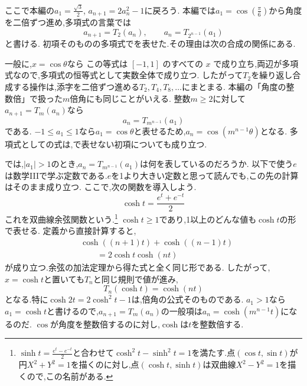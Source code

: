 ここで本編の$a_1=\frac{\sqrt3}{2}$, $a_{n+1}=2a_n^2-1$に戻ろう.
本編では$a_1=\cos(\frac{\pi}{6})$から角度を二倍ずつ進め,多項式の言葉では
\[
  a_{n+1}=T_2(a_n),\qquad
  a_n=T_{2^{n-1}}(a_1)
\]
と書ける.
初項そのものの多項式でを表せた.その理由は次の合成の関係にある.

一般に,$x=\cos\theta$なら
\BookMathLayout{\[
    T_m(T_k(x))
    =T_m(\cos(k\theta))
    =\cos(mk\theta)
    =T_{mk}(x).
  \]}{
  \[
    \begin{aligned}
      T_m(T_k(x))&=T_m(\cos(k\theta))\\
      &=\cos(mk\theta)=T_{mk}(x).
    \end{aligned}
  \]
}
この等式は $[-1,1]$ のすべての $x$ で成り立ち,両辺が多項式なので,多項式の恒等式として実数全体で成り立つ.
したがって$T_2$を繰り返し合成する操作は,添字を二倍ずつ進める$T_2,T_4,T_8,\ldots$にまとまる.
本編の「角度の整数倍」で扱った$m$倍角にも同じことがいえる.
整数$m\ge2$に対して$a_{n+1}=T_m(a_n)$なら
\[
  a_n=T_{m^{n-1}}(a_1)
\]
である.
$-1\le a_1\le1$なら$a_1=\cos\theta$と表せるため,$a_n=\cos(m^{n-1}\theta)$となる.
多項式としての式は,で表せない初項についても成り立つ.

\label{節：三角関数で表せない初項：双曲線関数}
では,$|a_1|>1$のとき,$a_n=T_{m^{n-1}}(a_1)$は何を表しているのだろうか.
以下で使う$e$は数学IIIで学ぶ定数である.$e$を1より大きい定数と思って読んでも,この先の計算はそのまま成り立つ.
ここで,次の関数を導入しよう.
\[
  \cosh t=\frac{e^t+e^{-t}}{2}
\]
これを双曲線余弦関数という.\footnote{$\sinh t=\frac{e^t-e^{-t}}{2}$と合わせて$\cosh^2t-\sinh^2t=1$を満たす.点$(\cos t,\sin t)$が円$X^2+Y^2=1$を描くのに対し,点$(\cosh t,\sinh t)$は双曲線$X^2-Y^2=1$を描くので,この名前がある.}
$\cosh t\ge1$であり,1以上のどんな値も$\cosh t$の形で表せる.
定義から直接計算すると,
\begin{align*}
  &\cosh((n+1)t)+\cosh((n-1)t)\\
  &\qquad=2\cosh t\cosh(nt)
\end{align*}
が成り立つ.余弦の加法定理から得た式と全く同じ形である.
したがって,$x=\cosh t$と置いても$T_n$と同じ規則で値が進み,
\[
  T_n(\cosh t)=\cosh(nt)
\]
となる.特に$\cosh2t=2\cosh^2t-1$は,倍角の公式そのものである.
$a_1>1$なら$a_1=\cosh t$と書けるので,$a_{n+1}=T_m(a_n)$の一般項は$a_n=\cosh(m^{n-1}t)$になるのだ.
$\cos$が角度を整数倍するのに対し,$\cosh$は$t$を整数倍する.

